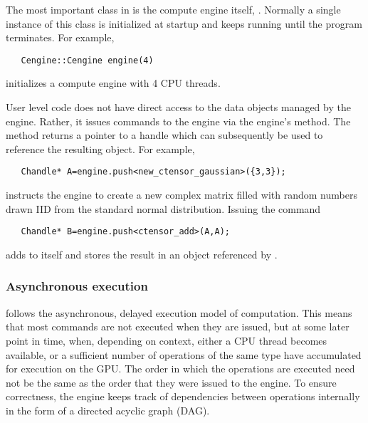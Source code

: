\vspace{-10pt}
The most important class in \Cengine{} is the compute engine itself, . 
Normally a single instance of this class is initialized at startup and keeps running until 
the program terminates. For example, 

\texttt{~~~Cengine::Cengine engine(4)}

initializes a compute engine with 4 CPU threads. 

User level code does not have direct access to the data objects managed by the engine. 
Rather, it issues commands to the engine via the engine's  method. 
The  method returns a pointer to a handle 
which can subsequently be used to reference the resulting object. For example, 

\texttt{~~~Chandle* A=engine.push<new\_ctensor\_gaussian>(\{3,3\});}

instructs the engine to create a new  complex matrix filled with random numbers 
drawn IID from the standard normal distribution. Issuing the command 

\texttt{~~~Chandle* B=engine.push<ctensor\_add>(A,A);}

adds  to itself and stores the result in an object referenced by . 

\subsubsection*{Asynchronous execution}

\Cengine{} follows the asynchronous, delayed execution model of computation. This means that most  
commands are not executed when they are issued, but at some later point in time, when,  
depending on context, either a CPU thread becomes available, or a sufficient number of operations 
of the same type have accumulated for execution on the GPU. 
The order in which the operations are executed need not be the same as the order that they 
were issued to the engine. 
To ensure correctness, the engine keeps track of dependencies between operations 
internally in the form of a directed acyclic graph (DAG). 
 

